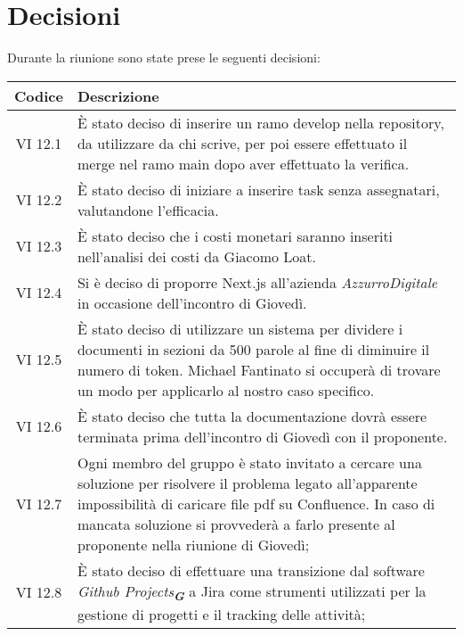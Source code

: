 
\section{Decisioni}

Durante la riunione sono state prese le seguenti decisioni:
 
\vspace{0.5cm}

\begin{table}[htbp]
    \centering
    \begin{tabular}{|c|p{}|}
        \hline
        \rowcolor[gray]{0.75}
        \textbf{Codice} & \textbf{Descrizione}\\
        \hline
        VI 12.1 & È stato deciso di inserire un ramo develop nella repository, da utilizzare da chi scrive, per poi essere effettuato il merge nel ramo main dopo aver effettuato la verifica.\\
        \hline
        VI 12.2 & È stato deciso di iniziare a inserire task senza assegnatari, valutandone l'efficacia.\\
        \hline
        VI 12.3 & È stato deciso che i costi monetari saranno inseriti nell'analisi dei costi da Giacomo Loat.\\
        \hline
        VI 12.4 & Si è deciso di proporre Next.js all'azienda \emph{AzzurroDigitale} in occasione dell'incontro di Giovedì.\\
        \hline
        VI 12.5 & È stato deciso di utilizzare un sistema per dividere i documenti in sezioni da 500 parole al fine di diminuire il numero di token. Michael Fantinato si occuperà di trovare un modo per applicarlo al nostro caso specifico.\\
        \hline
        VI 12.6 & È stato deciso che tutta la documentazione dovrà essere terminata prima dell'incontro di Giovedì con il proponente.\\
        \hline
        VI 12.7 & Ogni membro del gruppo è stato invitato a cercare una soluzione per risolvere il problema legato all'apparente impossibilità di caricare file pdf su Confluence. In caso di mancata soluzione si provvederà a farlo presente al proponente nella riunione di Giovedì;\\
        \hline
        VI 12.8 & È stato deciso di effettuare una transizione dal software \emph{Github Projects}\textsubscript{\textit{\textbf{G}}} a Jira come strumenti utilizzati per la gestione di progetti e il tracking delle attività;\\

\end{tabular}
\end{table}
